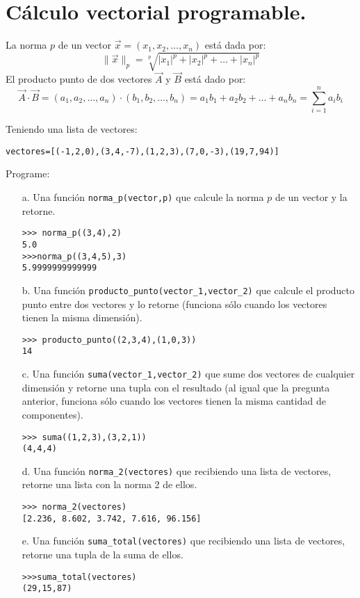 \section{Cálculo vectorial programable.}
La norma $p$ de un vector $\overrightarrow{x}=(x_{1},x_{2},\ldots,x_{n})$ está dada por:
\begin{displaymath}
\| \overrightarrow{x}\|_{p} = \sqrt[p]{|x_{1}|^{p} + |x_{2}|^{p} + \ldots + |x_{n}|^p}
\end{displaymath}
El producto punto de dos vectores $ \overrightarrow{A}$ y $ \overrightarrow{B}$ está dado por:
\begin{displaymath}
\overrightarrow{A} \cdot \overrightarrow{B}= (a_{1},a_{2},\ldots ,a_{n}) \cdot (b_{1},b_{2},\ldots,b_{n})=a_{1}b_{1}+a_{2}b_{2}+\ldots+a_{n}b_{n}=\sum_{i=1}^{n} a_{i}b_{i}
\end{displaymath}

Teniendo una lista de vectores:
\begin{lstlisting}[style=consola]
vectores=[(-1,2,0),(3,4,-7),(1,2,3),(7,0,-3),(19,7,94)]
\end{lstlisting}

Programe:
\begin{enumerate}
    \item[a.] Una función \texttt{norma\_p(vector,p)} que calcule la norma $p$ de un vector y la retorne.
    \begin{lstlisting}[style=consola]
>>> norma_p((3,4),2)
5.0
>>>norma_p((3,4,5),3)
5.9999999999999
    \end{lstlisting}
    \item[b.] Una función \texttt{producto\_punto(vector\_1,vector\_2)} que calcule el producto punto entre dos vectores y lo retorne (funciona sólo cuando los vectores tienen la misma dimensión).
    \begin{lstlisting}[style=consola]
>>> producto_punto((2,3,4),(1,0,3))
14
    \end{lstlisting}
    \item[c.] Una función \texttt{suma(vector\_1,vector\_2)} que sume dos vectores de cualquier dimensión y retorne una tupla con el resultado (al igual que la pregunta anterior, funciona sólo cuando los vectores tienen la misma cantidad de componentes).
    \begin{lstlisting}[style=consola]
>>> suma((1,2,3),(3,2,1))
(4,4,4)
    \end{lstlisting}
    \item[d.] Una función \texttt{norma\_2(vectores)} que recibiendo una lista de vectores, retorne una lista con la norma 2 de ellos.
\begin{lstlisting}[style=consola]
>>> norma_2(vectores)
[2.236, 8.602, 3.742, 7.616, 96.156]
\end{lstlisting}
    \item[e.] Una función \texttt{suma\_total(vectores)} que recibiendo una lista de vectores, retorne una tupla de la suma de ellos.
\begin{lstlisting}[style=consola]
>>>suma_total(vectores)
(29,15,87)
\end{lstlisting}
\end{enumerate}
